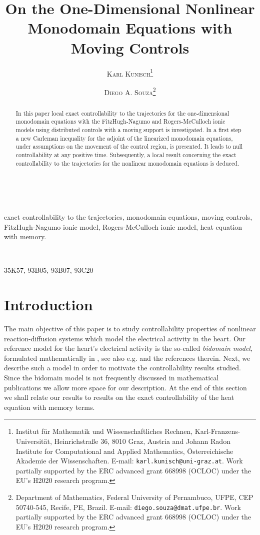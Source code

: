 \documentclass[10pt]{article}
\title{\textbf{On the One-Dimensional Nonlinear Monodomain Equations with Moving Controls}}
\author{
	\textsc{Karl Kunisch}\thanks{Institut f\"ur Mathematik und Wissenschaftliches Rechnen, Karl-Franzens-Universit\"at, Heinrichstra\ss e 36, 8010 Graz,
Austria and Johann Radon Institute for Computational and Applied Mathematics, \"Osterreichische Akademie der Wissenschaften. E-mail: {\tt karl.kunisch@uni-graz.at}. Work partially supported
	by the ERC advanced grant 668998 (OCLOC) under the EU's H2020 research program.}\quad
	\and
	\textsc{Diego A. Souza}\thanks{Department of Mathematics, Federal University of Pernambuco, UFPE, CEP 50740-545, Recife,
PE, Brazil. E-mail: {\tt diego.souza@dmat.ufpe.br}. Work partially supported
	by the ERC advanced grant 668998 (OCLOC) under the EU's H2020 research program.}}
\date{}
\begin{document}
\maketitle



\begin{abstract}
	In this paper local exact controllability to the trajectories for the one-dimensional monodomain
	equations with the FitzHugh-Nagumo and Rogers-McCulloch ionic models using distributed
	controls with a moving support is investigated. In a first step a new Carleman inequality for the adjoint of the
	linearized monodomain equations, under assumptions on the movement of the control region, is
	presented. It leads to null controllability at any positive time. Subsequently, a local result concerning
	the exact controllability to the trajectories for the nonlinear monodomain equations is deduced.
\end{abstract}

\

 exact controllability to the trajectories, monodomain equations, moving controls,
	FitzHugh-Nagumo ionic model, Rogers-McCulloch ionic model, heat equation with memory.
	
	\
	
  35K57, 93B05, 93B07, 93C20






\section{Introduction}

	The main objective of this paper is to study controllability properties of nonlinear reaction-diffusion
	systems which model the electrical activity in the heart. Our reference model for the heart's electrical
	activity is the so-called {\it bidomain model}, formulated mathematically in \cite{tung}, see also e.g.
	\cite[Chapter $2$]{sundnes} and the references therein. Next, we describe  such a model in order to
	motivate the controllability results studied. Since the  bidomain model is not frequently discussed in
	mathematical publications we allow more space for our description. At the end of this section we shall
	relate our results to results on the exact controllability of the heat equation with memory terms.
\end{document}

